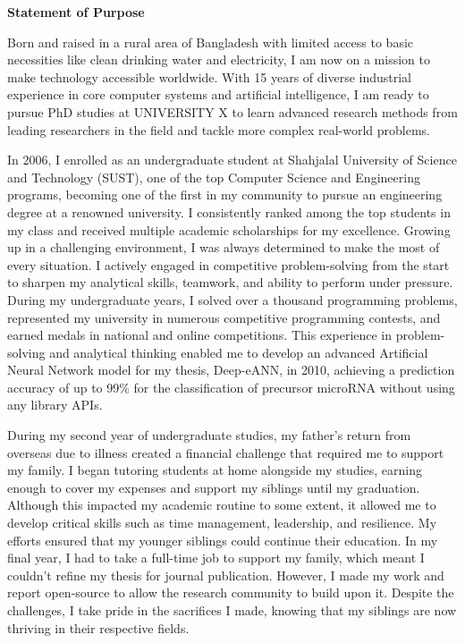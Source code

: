 \documentclass[11pt]{article}
\newif\ifshowsections
\newcommand{\tabsection}[1]{\par\noindent\textbf{#1}\par\indent}
\begin{document}
\begin{center}
    {\Large \textbf{Statement of Purpose}}
\end{center}


Born and raised in a rural area of Bangladesh with limited access to basic necessities like clean drinking water and electricity,
I am now on a mission to make technology accessible worldwide.
With 15 years of diverse industrial experience in core computer systems and artificial intelligence,
I am ready to pursue PhD studies at UNIVERSITY X to learn advanced research methods from leading researchers in the field
and tackle more complex real-world problems.

In 2006, I enrolled as an undergraduate student at Shahjalal University of Science and Technology (SUST),
one of the top Computer Science and Engineering programs, becoming one of the first in my community
to pursue an engineering degree at a renowned university.
I consistently ranked among the top students in my class and received multiple academic scholarships for my excellence.
Growing up in a challenging environment, I was always determined to make the most of every situation.
I actively engaged in competitive problem-solving from the start to sharpen my analytical skills, teamwork,
and ability to perform under pressure.
During my undergraduate years, I solved over a thousand programming problems, represented my university
in numerous competitive programming contests, and earned medals in national and online competitions.
This experience in problem-solving and analytical thinking enabled me to develop an advanced Artificial Neural Network
model for my thesis, Deep-eANN, in 2010, achieving a prediction accuracy of up to 99\% for the classification
of precursor microRNA without using any library APIs.

During my second year of undergraduate studies, my father’s return from overseas due to illness
created a financial challenge that required me to support my family.
I began tutoring students at home alongside my studies, earning enough to cover my expenses
and support my siblings until my graduation.
Although this impacted my academic routine to some extent, it allowed me to develop critical skills
such as time management, leadership, and resilience.
My efforts ensured that my younger siblings could continue their education.
In my final year, I had to take a full-time job to support my family, which meant I couldn't refine my thesis
for journal publication.
However, I made my work and report open-source to allow the research community to build upon it.
Despite the challenges, I take pride in the sacrifices I made, knowing that my siblings are now thriving
in their respective fields.
\end{document}
